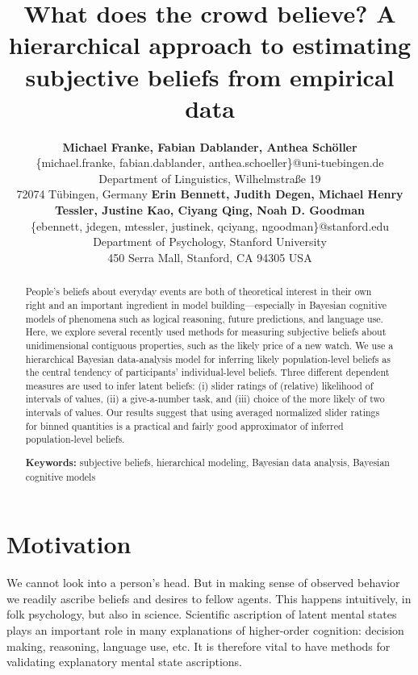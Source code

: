 \documentclass[10pt,letterpaper]{article}
\title{What does the crowd believe? A hierarchical approach to estimating subjective beliefs
  from empirical data}
\author{{\large \bf Michael Franke, Fabian Dablander, Anthea Sch\"{o}ller} \\
  \{michael.franke, fabian.dablander, anthea.schoeller\}@uni-tuebingen.de \\
  Department of Linguistics, Wilhelmstra\ss e 19 \\
  72074 T\"{u}bingen, Germany \AND
  {\large \bf Erin Bennett, Judith Degen, Michael Henry Tessler, Justine Kao, Ciyang Qing, Noah D. Goodman}\\
  \{ebennett, jdegen, mtessler, justinek, qciyang, ngoodman\}@stanford.edu \\
  Department of Psychology, Stanford University \\
  450 Serra Mall, Stanford, CA 94305 USA }
\begin{document}
\maketitle

\begin{abstract}
  People's beliefs about everyday events are both of theoretical interest in
  their own right and an important ingredient in model building---especially in 
  Bayesian cognitive models of phenomena such as logical reasoning, future predictions, and language
  use. Here, we explore several recently used methods for measuring subjective beliefs about
  unidimensional contiguous properties, such as the likely price of a new watch. We use a
  hierarchical Bayesian data-analysis model for inferring likely population-level beliefs as the central
  tendency of participants' individual-level beliefs.  Three different dependent measures are
  used to infer latent beliefs: (i) slider ratings of (relative) likelihood of intervals of
  values, (ii) a give-a-number task, and (iii) choice of the more likely of two intervals of
  values. Our results suggest that using averaged normalized slider ratings for binned
  quantities is a practical and fairly good approximator of inferred population-level beliefs.

  \textbf{Keywords:} subjective beliefs, hierarchical modeling, Bayesian data analysis,
  Bayesian cognitive models
\end{abstract}




\section{Motivation}

We cannot look into a person's head. But in making sense of observed behavior we readily
ascribe beliefs and desires to fellow agents. This happens intuitively, in folk psychology, but
also in science. Scientific ascription of latent mental states plays an important role in many
explanations of higher-order cognition: decision making, reasoning, language use, etc. It is
therefore vital to have methods for validating explanatory mental state ascriptions.
\end{document}
